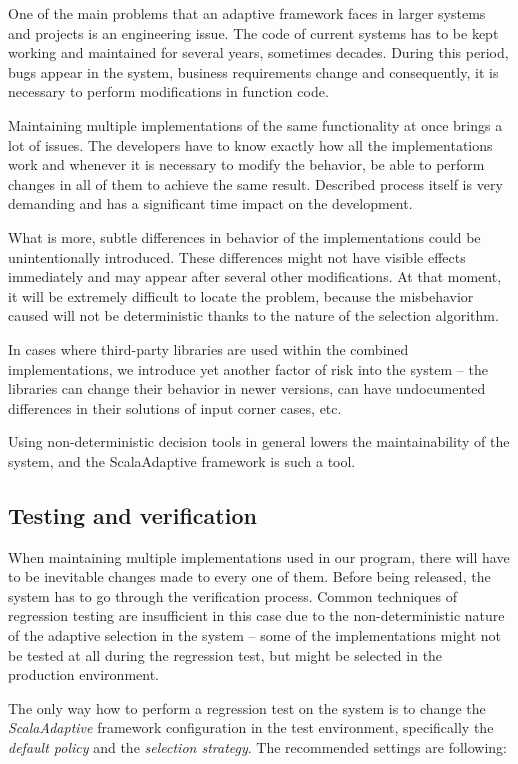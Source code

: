 One of the main problems that an adaptive framework faces in larger systems and projects is an engineering issue. The code of current systems has to be kept working and maintained for several years, sometimes decades. During this period, bugs appear in the system, business requirements change and consequently, it is necessary to perform modifications in function code.

Maintaining multiple implementations of the same functionality at once brings a lot of issues. The developers have to know exactly how all the implementations work and whenever it is necessary to modify the behavior, be able to perform changes in all of them to achieve the same result. Described process itself is very demanding and has a significant time impact on the development. 

What is more, subtle differences in behavior of the implementations could be unintentionally introduced. These differences might not have visible effects immediately and may appear after several other modifications. At that moment, it will be extremely difficult to locate the problem, because the misbehavior caused will not be deterministic thanks to the nature of the selection algorithm.

In cases where third-party libraries are used within the combined implementations, we introduce yet another factor of risk into the system -- the libraries can change their behavior in newer versions, can have undocumented differences in their solutions of input corner cases, etc. 

Using non-deterministic decision tools in general lowers the maintainability of the system, and the ScalaAdaptive framework is such a tool.

\subsection{Testing and verification}

When maintaining multiple implementations used in our program, there will have to be inevitable changes made to every one of them. Before being released, the system has to go through the verification process. Common techniques of regression testing are insufficient in this case due to the non-deterministic nature of the adaptive selection in the system -- some of the implementations might not be tested at all during the regression test, but might be selected in the production environment.

The only way how to perform a regression test on the system is to change the \textit{ScalaAdaptive} framework configuration in the test environment, specifically the \textit{default policy} and the \textit{selection strategy}. The recommended settings are following:

